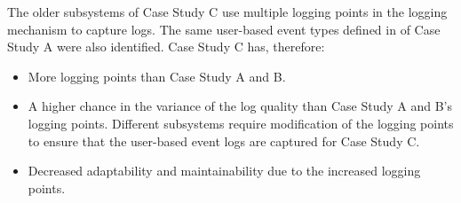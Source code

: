 The older subsystems of Case Study C use multiple logging points in the logging mechanism to capture logs. The same user-based event types defined in  of Case Study A were also identified. Case Study C has, therefore:

\begin{itemize}
	\item More logging points than Case Study A and B. 
	\item A higher chance in the variance of the log quality than Case Study A and B's logging points. Different subsystems require modification of the logging points to ensure that the user-based event logs are captured for Case Study C.
	\item Decreased adaptability and maintainability due to the increased logging points.
\end{itemize}


